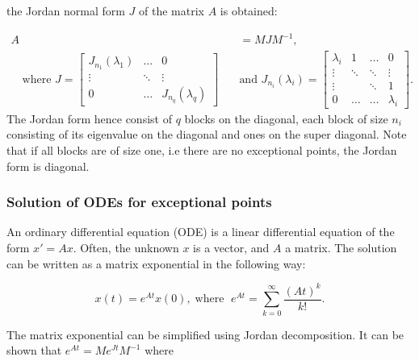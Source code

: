 \documentclass[../main.tex]{subfiles}
\begin{document}
the Jordan normal form $J$ of the matrix $A$ is obtained:

\begin{equation}
\begin{aligned}
    A &= MJM^{-1}, \\ \quad \text{where } J = \begin{bmatrix}J_{n_1}(\lambda_1) & \dots & 0 \\
                                                         \vdots & \ddots & \vdots \\
                                                         0 & \dots &  J_{n_q}(\lambda_q)\end{bmatrix} \quad
      &\text{and } J_{n_i}(\lambda_i) = \begin{bmatrix} \lambda_i & 1 & \dots & 0 \\
                                                                                        \vdots  & \ddots & \ddots & \vdots \\
                                                                                        \vdots & & \ddots& 1 \\
                                                                                        0 & \dots & \dots & \lambda_i\end{bmatrix}.
\end{aligned}
\end{equation}
The Jordan form hence consist of $q$ blocks on the diagonal, each block of size $n_i$ consisting of its eigenvalue on the diagonal and ones on the super diagonal. Note that if all blocks are of size one, i.e there are no exceptional points, the Jordan form is diagonal.

\subsubsection{Solution of ODEs for exceptional points}
An ordinary differential equation (ODE) is a linear differential equation of the form $x'=Ax$. Often, the unknown $x$ is a vector, and $A$ a matrix. The solution can be written as a matrix exponential in the following way:

\begin{equation}
    x(t) = e^{At}x(0), \;\text{where } \;e^{At} = \sum_{k=0}^{\infty}\frac{(At)^k}{k!}.
\end{equation}

The matrix exponential can be simplified using Jordan decomposition. It can be shown that  $e^{At} = Me^{Jt}M^{-1}$ where 
\end{document}
